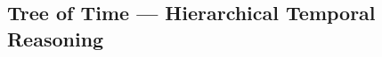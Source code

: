 

\vspace{-4mm}
\subsection{Tree of Time — Hierarchical Temporal Reasoning}
\label{sec:recursion}



